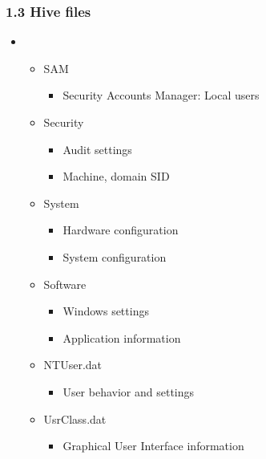 \begin{frame}[fragile]
  \frametitle{1.3 Hive files}
   \begin{itemize}
       \item[]
   \begin{itemize}
      \item SAM
      \begin{itemize}
          \item Security Accounts Manager: Local users
      \end{itemize}
      \item Security
      \begin{itemize}
          \item Audit settings
          \item Machine, domain SID
      \end{itemize}
      \item System
      \begin{itemize}
          \item Hardware configuration
          \item System configuration
       \end{itemize}
      \item Software
      \begin{itemize}
          \item Windows settings
          \item Application information
      \end{itemize}
      \item NTUser.dat
      \begin{itemize}
          \item User behavior and settings
      \end{itemize}
      \item UsrClass.dat
      \begin{itemize}
          \item Graphical User Interface information
      \end{itemize}
   \end{itemize}
   \end{itemize}
\end{frame}


